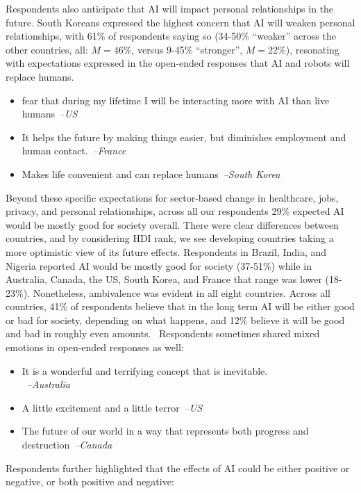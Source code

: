 \documentclass[sigconf]{acmart}
\newcommand\aff[1]{\textcolor{darkplum}{{\emph{--#1}}}}
\newcommand\q[1]{\textcolor{Mahogany}{\small{\textbf{}}}}
\newenvironment{lq2}
{ \begin{itemize}[leftmargin = 2.0em, rightmargin=1.0em, label={}]
    \fontsize{8.3pt}{8.9pt}\selectfont
\setlength{\itemsep}{3pt}
    \setlength{\parskip}{3pt}
    \setlength{\parsep}{3pt}     }
{ \end{itemize}                  }
\begin{document}
Respondents also anticipate that AI will impact personal relationships in the future. South Koreans expressed the highest concern that AI will weaken personal relationships, with 61\% of respondents saying so (34-50\% ``weaker'' across the other countries, all: $M=46\%$, versus 9-45\% ``stronger'', $M=22\%$), resonating with expectations expressed in the open-ended responses that AI and robots will replace humans.

\begin{lq2}
\item fear that during my lifetime I will be interacting more with AI than live humans~\aff{US}
\item It helps the future by making things easier, but diminishes employment and human contact.~\aff{France}
\item Makes life convenient and can replace humans~\aff{South Korea}
\end{lq2}



Beyond these specific expectations for sector-based change in healthcare, jobs, privacy, and personal relationships,
across all our respondents 29\% expected AI would be mostly good for society overall.
There were clear differences between countries, and by considering HDI rank, we see developing countries taking a more optimistic view of its future effects. Respondents in Brazil, India, and Nigeria reported AI would be mostly good for society (37-51\%) while in Australia, Canada, the US, South Korea, and France that range was lower (18-23\%).
Nonetheless, ambivalence was evident in all eight countries. Across all countries, 41\% of respondents believe that in the long term AI will be either good or bad for society, depending on what happens, and 12\% believe it will be good and bad in roughly even amounts.~\q{Q17} Respondents sometimes shared mixed emotions in open-ended responses as well:~\q{U1-U4}

\begin{lq2}
\item It is a wonderful and terrifying concept that is inevitable.\\~\aff{Australia}
\item A little excitement and a little terror~\aff{US}
\item The future of our world in a way that represents both progress and destruction~\aff{Canada}
\end{lq2}

Respondents further highlighted that the effects of AI could be either positive or negative, or both positive and negative:
\end{document}
